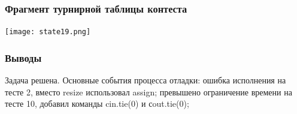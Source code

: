 \subsubsection*{Фрагмент турнирной таблицы контеста}
\begin{center}
\texttt{[image: state19.png]}\newline\noindent
\end{center}

\subsubsection*{Выводы}
Задача решена. Основные события процесса отладки: ошибка исполнения на тесте 2, вместо resize использовал assign; превышено ограничение времени на тесте 10, добавил команды cin.tie(0) и сout.tie(0);
